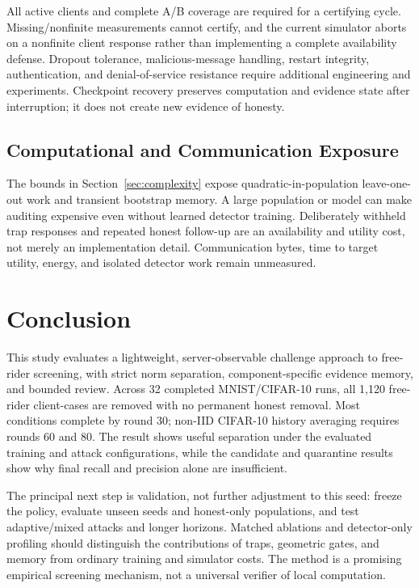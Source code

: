 \documentclass[conference]{IEEEtran}
\begin{document}
All active clients and complete A/B coverage are required for a certifying
cycle. Missing/nonfinite measurements cannot certify, and the current simulator
aborts on a nonfinite client response rather than implementing a complete
availability defense. Dropout tolerance, malicious-message handling, restart
integrity, authentication, and denial-of-service resistance require additional
engineering and experiments. Checkpoint recovery preserves computation and
evidence state after interruption; it does not create new evidence of honesty.

\subsection{Computational and Communication Exposure}
The bounds in Section~\ref{sec:complexity} expose quadratic-in-population
leave-one-out work and transient bootstrap memory. A large population or model
can make auditing expensive even without learned detector training. Deliberately
withheld trap responses and repeated honest follow-up are an availability and
utility cost, not merely an implementation detail. Communication bytes, time to
target utility, energy, and isolated detector work remain unmeasured.

\section{Conclusion}
This study evaluates a lightweight, server-observable challenge approach to
free-rider screening, with strict norm separation, component-specific evidence
memory, and bounded review. Across 32 completed MNIST/CIFAR-10 runs, all 1,120
free-rider client-cases are removed with no permanent honest removal. Most
conditions complete by round 30; non-IID CIFAR-10 history averaging requires
rounds 60 and 80. The result shows useful separation under the evaluated
training and attack configurations, while the candidate and quarantine results
show why final recall and precision alone are insufficient.

The principal next step is validation, not further adjustment to this seed:
freeze the policy, evaluate unseen seeds and honest-only populations, and test
adaptive/mixed attacks and longer horizons. Matched ablations and detector-only
profiling should distinguish the contributions of traps, geometric gates, and
memory from ordinary training and simulator costs. The method is a promising
empirical screening mechanism, not a universal verifier of local computation.
\end{document}
